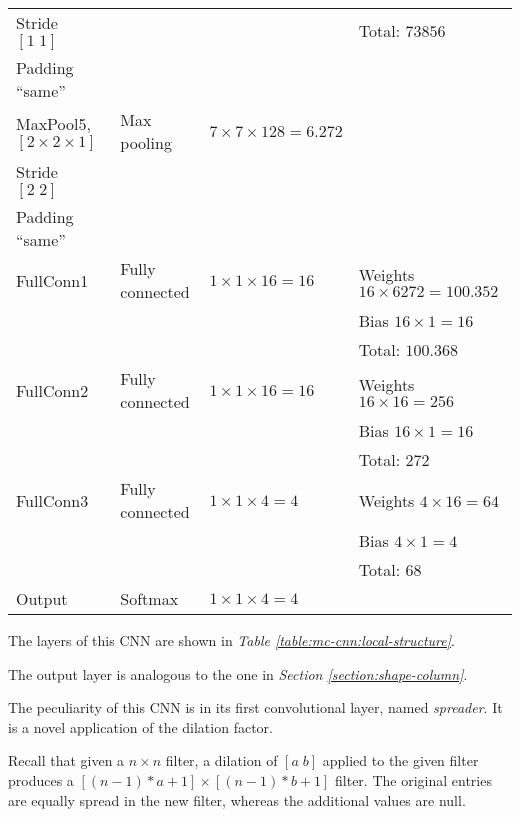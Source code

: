 \begin{table*}
\begin{tabular}{|l|l|l|l|}
                    Stride $\left[1\;1\right]$ & & & Total: $73856$\\
                    Padding ``same'' & & & \\\hline
                    MaxPool5, $\left[2\times 2\times 1\right]$ & Max pooling & $7\times 7\times 128 = 6.272$ & \\
                    Stride $\left[2\;2\right]$ & & & \\
                    Padding ``same'' & & & \\\hline
                    FullConn1 & Fully connected & $1\times 1\times 16 = 16$ & Weights $16\times 6272 = 100.352$\\
                    & & & Bias $16\times 1 = 16$\\
                    & & & Total: $100.368$\\\hline
                    FullConn2 & Fully connected & $1\times 1\times 16 = 16$ & Weights $16\times 16 = 256$\\
                    & & & Bias $16\times 1 = 16$\\
                    & & & Total: $272$\\\hline
                    FullConn3 & Fully connected & $1\times 1\times 4 = 4$ & Weights $4\times 16 = 64$\\
                    & & & Bias $4\times 1 = 4$\\
                    & & & Total: $68$\\\hline
                    Output & Softmax & $1\times 1\times 4 = 4$ & \\
                \hline
            \end{tabular}
            \vspace{0.5cm}
            \caption{Local column CNN layers.}\label{table:mc-cnn:local-structure}
        \end{table*}
        \par{
            The layers of this CNN are shown in \emph{Table \ref{table:mc-cnn:local-structure}}.
        }
        \par{
            The output layer is analogous to the one in \emph{Section \ref{section:shape-column}}.
        }
        \par{
            The peculiarity of this CNN is in its first convolutional layer, named \emph{spreader}. It is a novel application of the dilation factor. 
        }
        \par{
            Recall that given a $n\times n$ filter, a dilation of $[a\;b]$ applied to the given filter produces a $\left[\left(n-1\right)*a + 1\right] \times \left[\left(n-1\right)*b + 1\right]$ filter. The original entries are equally spread in the new filter, whereas the additional values are null.
        }
